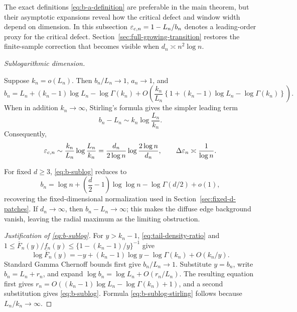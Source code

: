 The exact definitions \eqref{eq:b-a-definition} are preferable in the main
theorem, but their asymptotic expansions reveal how the critical defect and
window width depend on dimension. In this subsection
\(\varepsilon_{c,n}=1-L_n/b_n\) denotes a leading-order proxy for the critical
defect. Section~\ref{sec:full-growing-transition} restores the finite-sample
correction that becomes visible when \(d_n\asymp n^2\log n\).

\medskip
\noindent\emph{Sublogarithmic dimension.}

Suppose \(k_n=o(L_n)\). Then \(b_n/L_n\to1\), \(a_n\to1\), and
\begin{equation}
\label{eq:b-sublog}
  b_n
  =
  L_n+(k_n-1)\log L_n-\log\Gamma(k_n)
  +O\left(
    \frac{k_n}{L_n}
    \left\{1+(k_n-1)\log L_n-\log\Gamma(k_n)\right\}
  \right).
\end{equation}
When in addition \(k_n\to\infty\), Stirling's formula gives the simpler
leading term
\begin{equation}
\label{eq:b-sublog-stirling}
  b_n-L_n
  \sim
  k_n\log\frac{L_n}{k_n}.
\end{equation}
Consequently,
\begin{equation}
\label{eq:epsilon-sublog}
  \varepsilon_{c,n}
  \sim
  \frac{k_n}{L_n}\log\frac{L_n}{k_n}
  =
  \frac{d_n}{2\log n}
  \log\frac{2\log n}{d_n},
  \qquad
  \Delta\varepsilon_n\asymp\frac1{\log n}.
\end{equation}

For fixed \(d\ge3\), \eqref{eq:b-sublog} reduces to
\[
  b_n
  =
  \log n+\left(\frac d2-1\right)\log\log n
  -\log\Gamma(d/2)+o(1),
\]
recovering the fixed-dimensional normalization used in
Section~\ref{sec:fixed-d-patches}. If
\(d_n\to\infty\), then \(b_n-L_n\to\infty\); this makes the diffuse edge
background vanish, leaving the radial maximum as the limiting obstruction.

\begin{proof}[Justification of \eqref{eq:b-sublog}]
For \(y>k_n-1\), \eqref{eq:tail-density-ratio} and
\(1\le\overline F_n(y)/f_n(y)\le\{1-(k_n-1)/y\}^{-1}\) give
\[
  \log\overline F_n(y)
  =
  -y+(k_n-1)\log y-\log\Gamma(k_n)+O(k_n/y).
\]
Standard Gamma Chernoff bounds first give \(b_n/L_n\to1\). Substitute
\(y=b_n\), write \(b_n=L_n+r_n\), and expand
\(\log b_n=\log L_n+O(r_n/L_n)\). The resulting equation first gives
\(r_n=O((k_n-1)\log L_n-\log\Gamma(k_n)+1)\), and a second substitution
gives \eqref{eq:b-sublog}. Formula \eqref{eq:b-sublog-stirling} follows
because \(L_n/k_n\to\infty\).
\end{proof}

